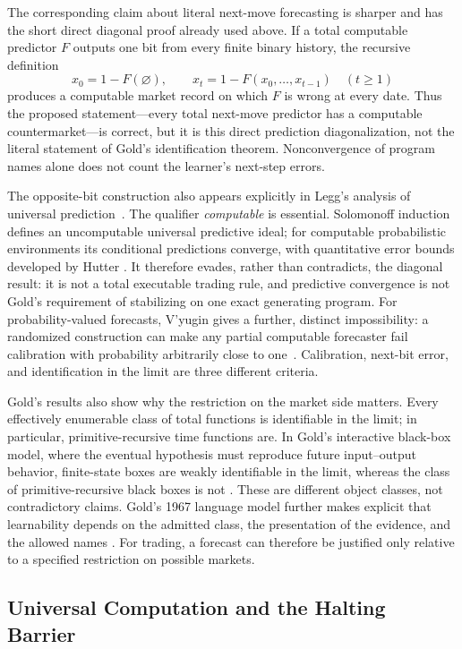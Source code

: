 \documentclass[aps,pra,reprint,superscriptaddress,amsmath,amssymb,floatfix]{revtex4-2}
\theoremstyle{plain}
\theoremstyle{definition}
\theoremstyle{remark}
\begin{document}
The corresponding claim about literal next-move forecasting is sharper and
has the short direct diagonal proof already used above. If a total computable
predictor \(F\) outputs one bit from every finite binary history, the recursive
definition
\[
  x_0=1-F(\varnothing),
  \qquad
  x_t=1-F(x_0,\ldots,x_{t-1})\quad(t\geq1)
\]
produces a computable market record on which \(F\) is wrong at every date.
Thus the proposed statement---every total next-move predictor has a computable
countermarket---is correct, but it is this direct prediction diagonalization,
not the literal statement of Gold's identification theorem. Nonconvergence of
program names alone does not count the learner's next-step errors.

The opposite-bit construction also appears explicitly in Legg's analysis of
universal prediction~\cite{Legg2006}. The qualifier \emph{computable} is
essential. Solomonoff induction defines an uncomputable universal predictive
ideal; for computable probabilistic environments its conditional predictions
converge, with quantitative error bounds developed by Hutter
\cite{solomonoff,solomonoff-II,solomonoff1,Hutter2001}. It therefore evades,
rather than contradicts, the diagonal result: it is not a total executable
trading rule, and predictive convergence is not Gold's requirement of
stabilizing on one exact generating program. For probability-valued forecasts,
V'yugin gives a further, distinct impossibility: a randomized construction can
make any partial computable forecaster fail calibration with probability
arbitrarily close to one~\cite{Vyugin2006}. Calibration, next-bit error, and
identification in the limit are three different criteria.

Gold's results also show why the restriction on the market side matters. Every
effectively enumerable class of total functions is identifiable in the limit;
in particular, primitive-recursive time functions are. In Gold's interactive
black-box model, where the eventual hypothesis must reproduce future
input--output behavior, finite-state boxes are weakly identifiable in the
limit, whereas the class of primitive-recursive black boxes is not
\cite{go-65}. These are different object classes, not contradictory claims.
Gold's 1967 language model further makes explicit that learnability depends on
the admitted class, the presentation of the evidence, and the allowed names
\cite{go-67}. For trading, a forecast can therefore be justified only relative
to a specified restriction on possible markets.

\subsection{Universal Computation and the Halting Barrier}
\end{document}
